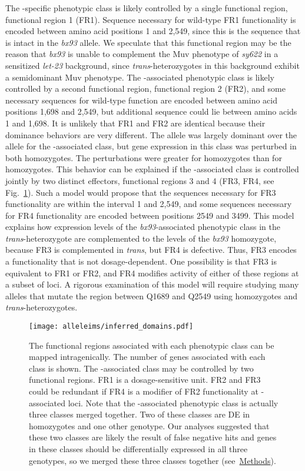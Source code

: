 The \sy{}-specific phenotypic class is likely controlled by a single functional
region, functional region 1 (FR1). Sequence necessary for wild-type FR1
functionality is encoded between amino acid positions 1 and 2,549, since this is
the sequence that is intact in the \emph{bx93} allele. We speculate that this
functional region may be the reason that \emph{bx93} is unable to complement the
Muv phenotype of \emph{sy622} in a sensitized \emph{let-23} background, since
\emph{trans}-heterozygotes in this background exhibit a semidominant Muv
phenotype.  The \sy{}-associated phenotypic class is likely controlled by a
second functional region, functional region 2 (FR2), and some necessary
sequences for wild-type function are encoded between amino acid positions 1,698
and 2,549, but additional sequence could lie between amino acids 1 and 1,698. It
is unlikely that FR1 and FR2 are identical because their dominance behaviors are
very different. The \bx{} allele was largely dominant over the \sy{} allele for
the \bx{}-associated class, but gene expression in this class was perturbed in
both homozygotes. The perturbations were greater for \sy{} homozygotes than for
\bx{} homozygotes. This behavior can be explained if the \bx{}-associated class
is controlled jointly by two distinct effectors, functional regions 3 and 4
(FR3, FR4, see Fig.~\ref{fig:domains}). Such a model would propose that the
sequences necessary for FR3 functionality are within the interval 1 and 2,549,
and some sequences necessary for FR4 functionality are encoded between positions
2549 and 3499. This model explains how expression levels of the
\emph{bx93}-associated phenotypic class in the \emph{trans}-heterozygote are
complemented to the levels of the \emph{bx93} homozygote, because FR3 is
complemented in \emph{trans}, but FR4 is defective. Thus, FR3 encodes a
functionality that is not dosage-dependent. One possibility is that FR3 is
equivalent to FR1 or FR2, and FR4 modifies activity of either of these regions
at a subset of loci. A rigorous examination of this model will require studying
many alleles that mutate the region between Q1689 and Q2549 using homozygotes
and \emph{trans}-heterozygotes.

\begin{figure}
  \centering{}
  \texttt{[image: alleleims/inferred\_domains.pdf]}
  \caption{
          The functional regions associated with each phenotypic class can be
          mapped intragenically. The number of genes associated with each class
          is shown. The \bx{}-associated class may be controlled by two
          functional regions. FR1 is a dosage-sensitive unit. FR2 and FR3 could
          be redundant if FR4 is a modifier of FR2 functionality at
          \bx{}-associated loci. Note that the \bx{}-associated phenotypic class
          is actually three classes merged together. Two of these classes are DE
          in \bx{} homozygotes and one other genotype. Our analyses suggested
          that these two classes are likely the result of false negative hits
          and genes in these classes should be differentially expressed in all
          three genotypes, so we merged these three classes together
          (see~\hyperref[sec:methods]{Methods}). }
\label{fig:domains}
\end{figure}

